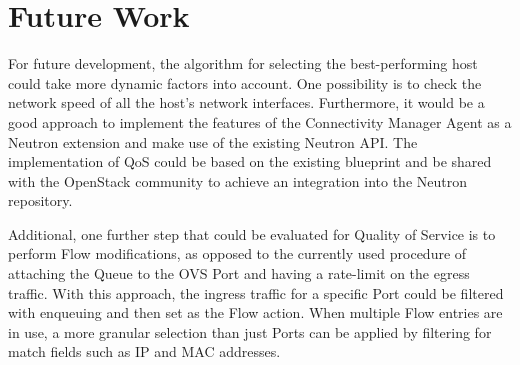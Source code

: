 \section{Future Work}

For future development, the algorithm for selecting the best-performing host could take more dynamic factors into account. One possibility is to check the network speed of all the host's network interfaces. Furthermore, it would be a good approach to implement the features of the Connectivity Manager Agent as a Neutron extension and make use of the existing Neutron API. The implementation of QoS could be based on the existing blueprint and be shared with the OpenStack community to achieve an integration into the Neutron repository.

Additional, one further step that could be evaluated for Quality of Service is to perform Flow modifications, as opposed to the currently used procedure of attaching the Queue to the OVS Port and having a rate-limit on the egress traffic. With this approach, the ingress traffic for a specific Port could be filtered with enqueuing and then set as the Flow action.  When multiple Flow entries are in use, a more granular selection than just Ports can be applied by filtering for match fields such as IP and MAC addresses.